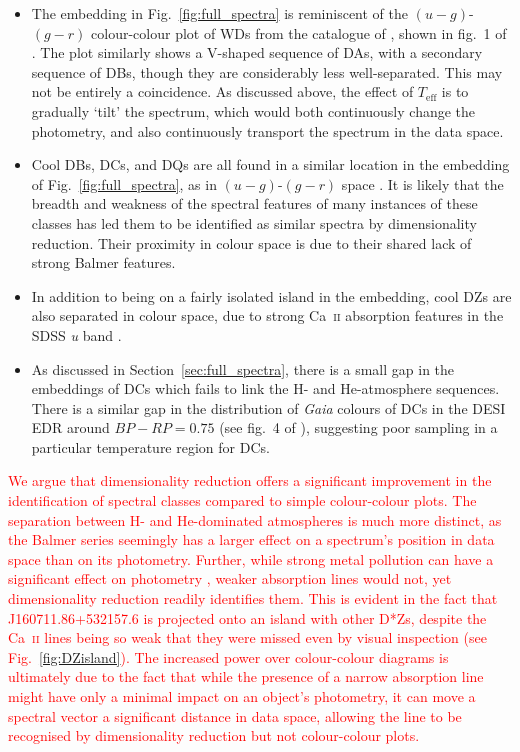 \documentclass[fleqn,usenatbib]{mnras}
\def\Teff{T_\mathrm{eff}}
\newcommand{\red}[1]{\textcolor{red}{#1}}
\begin{document}
\begin{itemize}
\item
The embedding in Fig.~\ref{fig:full_spectra} is reminiscent of the $(u-g)$-$(g-r)$ colour-colour plot of WDs from the catalogue of \citet{gentilefusillo19}, shown in fig.~1 of \citet{manser20}.
The plot similarly shows a V-shaped sequence of DAs, with a secondary sequence of DBs, though they are considerably less well-separated.
This may not be entirely a coincidence.
As discussed above, the effect of $\Teff$ is to gradually `tilt' the spectrum, which would both continuously change the photometry, and also continuously transport the spectrum in the data space.
\item
Cool DBs, DCs, and DQs are all found in a similar location in the embedding of Fig.~\ref{fig:full_spectra}, as in $(u-g)$-$(g-r)$ space \citep{manser20}.
It is likely that the breadth and weakness of the spectral features of many instances of these classes has led them to be identified as similar spectra by dimensionality reduction.
Their proximity in colour space is due to their shared lack of strong Balmer features.
\item
In addition to being on a fairly isolated island in the embedding, cool DZs are also separated in colour space, due to strong Ca~\textsc{ii} absorption features in the SDSS \textit{u} band \citep{hollands15}.
\item
As discussed in Section~\ref{sec:full_spectra}, there is a small gap in the embeddings of DCs which fails to link the H- and He-atmosphere sequences.
There is a similar gap in the distribution of \textit{Gaia} colours of DCs in the DESI EDR around $\mathit{BP}-\mathit{RP}=0.75$ (see fig.~4 of \citealt{manser24}), suggesting poor sampling in a particular temperature region for DCs.
\end{itemize}

\red{
We argue that dimensionality reduction offers a significant improvement in the identification of spectral classes compared to simple colour-colour plots.
The separation between H- and He-dominated atmospheres is much more distinct, as the Balmer series seemingly has a larger effect on a spectrum's position in data space than on its photometry.
Further, while strong metal pollution can have a significant effect on photometry \citep{hollands15}, weaker absorption lines would not, yet dimensionality reduction readily identifies them.
This is evident in the fact that J160711.86+532157.6 is projected onto an island with other D*Zs, despite the Ca~\textsc{ii} lines being so weak that they were missed even by visual inspection (see Fig.~\ref{fig:DZisland}).
The increased power over colour-colour diagrams is ultimately due to the fact that while the presence of a narrow absorption line might have only a minimal impact on an object's photometry, it can move a spectral vector a significant distance in data space, allowing the line to be recognised by dimensionality reduction but not colour-colour plots.
}
\end{document}
